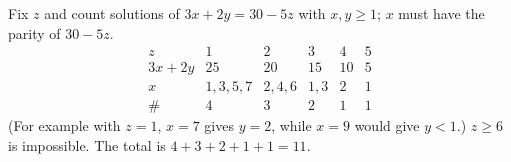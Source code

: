 Fix $z$ and count solutions of $3x+2y=30-5z$ with $x,y\ge1$; $x$ must have the parity of $30-5z$.
\[\begin{array}{c|ccccc}z&1&2&3&4&5\\\hline 3x+2y&25&20&15&10&5\\ x&1,3,5,7&2,4,6&1,3&2&1\\ \#&4&3&2&1&1\end{array}\]
(For example with $z=1$, $x=7$ gives $y=2$, while $x=9$ would give $y<1$.) $z\ge6$ is impossible. The total is $4+3+2+1+1=\boxed{11}$.
